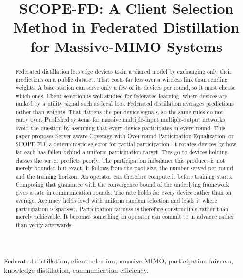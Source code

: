 \documentclass[journal]{IEEEtran}
\newcommand{\rev}[1]{#1}
\begin{document}
\title{SCOPE-FD: A Client Selection Method in Federated Distillation for Massive-MIMO Systems}

\author{
}

\maketitle

\begin{abstract}
\rev{Federated distillation lets edge devices train a shared model by exchanging only their predictions on a public dataset. That costs far less over a wireless link than sending weights. A base station can serve only a few of its devices per round, so it must choose which ones. Client selection is well studied for federated learning, where devices are ranked by a utility signal such as local loss. Federated distillation averages predictions rather than weights. That flattens the per-device signals, so the same rules do not carry over. Published systems for massive multiple-input multiple-output networks avoid the question by assuming that every device participates in every round. This paper proposes Server-aware Coverage with Over-round Participation Equalization, or SCOPE-FD, a deterministic selector for partial participation. It rotates devices by how far each has fallen behind a uniform participation target. Ties go to devices holding classes the server predicts poorly. The participation imbalance this produces is not merely bounded but exact. It follows from the pool size, the number served per round and the training horizon. An operator can therefore compute it before training starts. Composing that guarantee with the convergence bound of the underlying framework gives a rate in communication rounds. The rate holds for every device rather than on average. Accuracy holds level with uniform random selection and leads it where participation is sparsest. Participation fairness is therefore constructible rather than merely achievable. It becomes something an operator can commit to in advance rather than verify afterwards.}
\end{abstract}

\begin{IEEEkeywords}
Federated distillation, client selection, massive MIMO, participation fairness, knowledge distillation, communication efficiency.
\end{IEEEkeywords}
\end{document}
